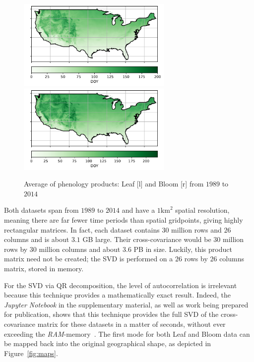 \documentclass[ijgi,article,submit,moreauthors,pdftex,10pt,a4paper]{Definitions/mdpi}
\begin{document}
\begin{figure}[H]
\centering
\includegraphics[width=7.5cm]{Results/Leafmean.pdf} ~~~~~ \includegraphics[width=7.5cm]{Results/Bloommean.pdf}
\caption{Average of phenology products: Leaf [l] and Bloom [r] from $1989$ to $2014$}
\label{fig:phenologydata}
\end{figure}

Both datasets span from $1989$ to $2014$ and have a $1\text{km}^2$ spatial resolution, meaning there are far fewer time periods than spatial gridpoints, giving highly rectangular matrices. In fact, each dataset contains $30$ million rows and $26$ columns and is about $3.1$ GB large. Their cross-covariance would be $30$ million rows by $30$ million columns and about $3.6$ PB in size. Luckily, this product matrix need not be created; the SVD is performed on a $26$ rows by $26$ columns matrix, stored in memory.

For the SVD via QR decomposition, the level of autocorrelation is irrelevant because this technique provides a mathematically exact result. Indeed, the \textit{Jupyter Notebook} in the supplementary material, as well as work being prepared for publication, shows that this technique provides the full SVD of the cross-covariance matrix for these datasets in a matter of seconds, without ever exceeding the \textit{RAM}-memory~\cite{Bogaardt2018, ZuritaMilla2018}. The first mode for both Leaf and Bloom data can be mapped back into the original geographical shape, as depicted in Figure~\ref{fig:maps}.
\end{document}
